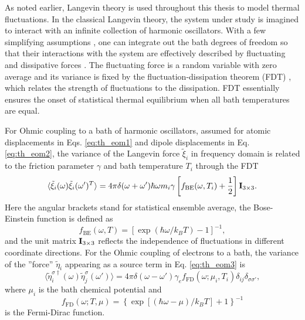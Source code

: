 As noted earlier, Langevin theory is used throughout this thesis to model thermal fluctuations. In the classical Langevin theory, the system under study is imagined to interact with an infinite collection of harmonic oscillators. With a few simplifying assumptions \cite{weiss}, one can integrate out the bath degrees of freedom so that their interactions with the system are effectively described by fluctuating and dissipative forces \cite{weiss,dhar06}. The fluctuating force is a random variable with zero average and its variance is fixed by the fluctuation-dissipation theorem (FDT) \cite{nyquist28,callen51}, which relates the strength of fluctuations to the dissipation. FDT essentially ensures the onset of statistical thermal equilibrium when all bath temperatures are equal.

For Ohmic coupling to a bath of harmonic oscillators, assumed for atomic displacements in Eqs. \eqref{eq:th_eom1} and dipole displacements in Eq. \eqref{eq:th_eom2}, the variance of the Langevin force $\tilde{\xi}_i$ in frequency domain is related to the friction parameter $\gamma$ and bath temperature $T_i$ through the FDT \cite{weiss,dhar06}
\begin{equation}
 \langle \tilde \xi_i(\omega) \tilde \xi_i(\omega')^T \rangle = 4\pi \delta(\omega+\omega') \hbar \omega m_i \gamma \left[f_{\textrm{BE}}(\omega,T_i)+ \frac{1}{2} \right] \mathbf{I}_{3\times 3}. \label{eq:th_xixiom_ohmic_qm}
\end{equation}
Here the angular brackets stand for statistical ensemble average, the Bose-Einstein function is defined as
\begin{equation}
 f_{\textrm{BE}}(\omega,T)=\left[\exp(\hbar \omega/k_BT)-1\right]^{-1}, \label{eq:th_fBE}
\end{equation}
and the unit matrix $\mathbf{I}_{3 \times 3}$ reflects the independence of fluctuations in different coordinate directions. For the Ohmic coupling of electrons to a bath, the variance of the ''force'' $\tilde{\eta}_i$ appearing as a source term in Eq. \eqref{eq:th_eom3} is \cite{dhar03,dhar06b,roy07}
\begin{equation}
 \langle \tilde \eta_{i}^{\sigma\dagger}(\omega) \tilde \eta_{j}^{\sigma}(\omega') \rangle = 4\pi\delta(\omega-\omega') \gamma_e f_{\textrm{FD}}(\omega;\mu_{i},T_{i}) \delta_{ij}\delta_{\sigma\sigma'}, \label{eq:th_etaetaom}
\end{equation}
where $\mu_i$ is the bath chemical potential and 
\begin{equation}
 f_{\textrm{FD}}(\omega;T,\mu)=\left\{\exp\left[(\hbar \omega-\mu)/k_BT\right]+1\right\}^{-1}
\end{equation}
is the Fermi-Dirac function.

